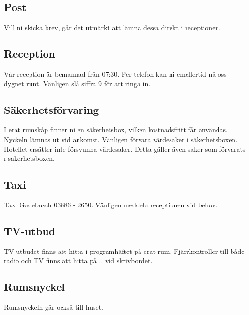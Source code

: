 \documentclass{article}
\begin{document}
\subsection{Post}
Vill ni skicka brev, går det utmärkt att lämna dessa direkt i receptionen.

\subsection{Reception}
Vår reception är bemannad från 07:30. Per telefon kan ni emellertid nå oss dygnet runt. Vänligen slå siffra 9 för
att ringa in.
\subsection{Säkerhetsförvaring}
I erat rumskåp finner ni en säkerhetsbox, vilken kostnadsfritt får användas.
Nyckeln lämnas ut vid ankomst.  Vänligen förvara värdesaker i säkerhetsboxen.
Hotellet ersätter inte försvunna värdesaker. Detta gäller även saker som
förvarats i säkerhetsboxen.

\subsection{Taxi}
Taxi Gadebusch 03886 - 2650. Vänligen meddela receptionen vid behov.

\subsection{TV-utbud}
TV-utbudet finns att hitta i programhäftet på erat rum. Fjärrkontroller till
både radio och TV finns att hitta på .. vid skrivbordet.

\subsection{Rumsnyckel}
Rumsnyckeln går också till huset.
\end{document}
